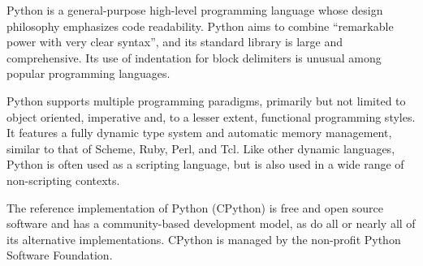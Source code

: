 \documentclass{article}
\begin{document}
Python is a general-purpose high-level programming language whose
design philosophy emphasizes code readability. Python aims to combine
``remarkable power with very clear syntax'', and its standard library is
large and comprehensive. Its use of indentation for block delimiters
is unusual among popular programming languages.

Python supports multiple programming paradigms, primarily but not
limited to object oriented, imperative and, to a lesser extent,
functional programming styles. It features a fully dynamic type system
and automatic memory management, similar to that of Scheme, Ruby,
Perl, and Tcl. Like other dynamic languages, Python is often used as a
scripting language, but is also used in a wide range of non-scripting
contexts. 

The reference implementation of Python (CPython) is free and open
source software and has a community-based development model, as do all
or nearly all of its alternative implementations. CPython is managed
by the non-profit Python Software Foundation.
\end{document}

